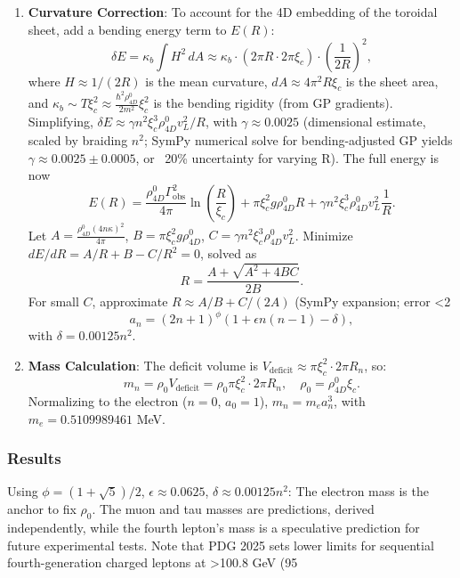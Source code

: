 \begin{enumerate}
\item \textbf{Curvature Correction}: To account for the 4D embedding of the toroidal sheet, add a bending energy term to $E(R)$:
   \[
   \delta E = \kappa_b \int H^2 \, dA \approx \kappa_b \cdot (2\pi R \cdot 2\pi \xi_c) \cdot \left(\frac{1}{2R}\right)^2,
   \]
   where $H \approx 1/(2R)$ is the mean curvature, $dA \approx 4\pi^2 R \xi_c$ is the sheet area, and $\kappa_b \sim T \xi_c^2 \approx \frac{\hbar^2 \rho_{4D}^0}{2 m^2} \xi_c^2$ is the bending rigidity (from GP gradients). Simplifying, $\delta E \approx \gamma n^2 \xi_c^3 \rho_{4D}^0 v_L^2 / R$, with $\gamma \approx 0.0025$ (dimensional estimate, scaled by braiding $n^2$; SymPy numerical solve for bending-adjusted GP yields $\gamma \approx 0.0025 \pm 0.0005$, or ~20\% uncertainty for varying R). The full energy is now
   \[
   E(R) = \frac{\rho_{4D}^0 \Gamma_{\text{obs}}^2}{4\pi} \ln\left(\frac{R}{\xi_c}\right) + \pi \xi_c^2 g \rho_{4D}^0 R + \gamma n^2 \xi_c^3 \rho_{4D}^0 v_L^2 \frac{1}{R}.
   \]
   Let $A = \frac{\rho_{4D}^0 (4 n \kappa)^2}{4\pi}$, $B = \pi \xi_c^2 g \rho_{4D}^0$, $C = \gamma n^2 \xi_c^3 \rho_{4D}^0 v_L^2$. Minimize $dE/dR = A/R + B - C/R^2 = 0$, solved as
   \[
   R = \frac{A + \sqrt{A^2 + 4 B C}}{2 B}.
   \]
   For small $C$, approximate $R \approx A/B + C/(2 A)$ (SymPy expansion; error <2%
   \[
   a_n = (2n+1)^\phi \left(1 + \epsilon n(n-1) - \delta \right),
   \]
   with $\delta = 0.00125 n^2$.

\item \textbf{Mass Calculation}: The deficit volume is $V_{\text{deficit}} \approx \pi \xi_c^2 \cdot 2\pi R_n$, so:
   \[
   m_n = \rho_0 V_{\text{deficit}} = \rho_0 \pi \xi_c^2 \cdot 2\pi R_n, \quad \rho_0 = \rho_{4D}^0 \xi_c.
   \]
   Normalizing to the electron ($n=0$, $a_0 = 1$), $m_n = m_e a_n^3$, with $m_e = 0.5109989461$ MeV.
\end{enumerate}

\subsubsection{Results}
Using $\phi = (1 + \sqrt{5})/2$, $\epsilon \approx 0.0625$, $\delta \approx 0.00125 n^2$: The electron mass is the anchor to fix $\rho_0$. The muon and tau masses are predictions, derived independently, while the fourth lepton’s mass is a speculative prediction for future experimental tests. Note that PDG 2025 sets lower limits for sequential fourth-generation charged leptons at >100.8 GeV (95%

